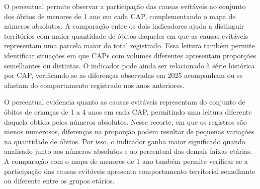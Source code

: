 
O percentual permite observar a participação das causas evitáveis no conjunto dos óbitos de menores de 1 ano em cada CAP, complementando o mapa de números absolutos. A comparação entre os dois indicadores ajuda a distinguir territórios com maior quantidade de óbitos daqueles em que as causas evitáveis representam uma parcela maior do total registrado. Essa leitura também permite identificar situações em que CAPs com volumes diferentes apresentam proporções semelhantes ou distintas. O indicador pode ainda ser relacionado à série histórica por CAP, verificando se as diferenças observadas em 2025 acompanham ou se afastam do comportamento registrado nos anos anteriores.


O percentual evidencia quanto as causas evitáveis representam do conjunto de óbitos de crianças de 1 a 4 anos em cada CAP, permitindo uma leitura diferente daquela obtida pelos números absolutos. Nesse recorte, em que os registros são menos numerosos, diferenças na proporção podem resultar de pequenas variações na quantidade de óbitos. Por isso, o indicador ganha maior significado quando analisado junto aos números absolutos e ao percentual das demais faixas etárias. A comparação com o mapa de menores de 1 ano também permite verificar se a participação das causas evitáveis apresenta comportamento territorial semelhante ou diferente entre os grupos etários.



